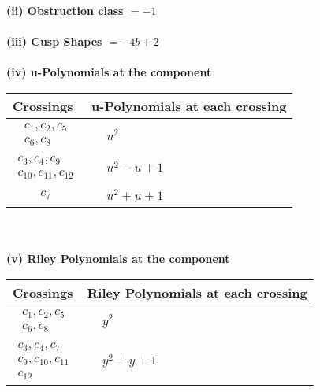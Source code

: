 \documentclass[1p]{elsarticle_modified}
\theoremstyle{definition}
\begin{document}
\flushleft \textbf{(ii) Obstruction class $= -1$}\\~\\
\flushleft \textbf{(iii) Cusp Shapes $= -4 b+2$}\\~\\
\newpage\renewcommand{\arraystretch}{1}
\flushleft \textbf{(iv) u-Polynomials at the component}\newline \\
\begin{tabular}{m{50pt}|m{274pt}}
Crossings & \hspace{64pt}u-Polynomials at each crossing \\
\hline $$\begin{aligned}c_{1},c_{2},c_{5}\\c_{6},c_{8}\end{aligned}$$&$\begin{aligned}
&u^2
\end{aligned}$\\
\hline $$\begin{aligned}c_{3},c_{4},c_{9}\\c_{10},c_{11},c_{12}\end{aligned}$$&$\begin{aligned}
&u^2- u+1
\end{aligned}$\\
\hline $$\begin{aligned}c_{7}\end{aligned}$$&$\begin{aligned}
&u^2+u+1
\end{aligned}$\\
\hline
\end{tabular}\\~\\
\newpage\renewcommand{\arraystretch}{1}
\flushleft \textbf{(v) Riley Polynomials at the component}\newline \\
\begin{tabular}{m{50pt}|m{274pt}}
Crossings & \hspace{64pt}Riley Polynomials at each crossing \\
\hline $$\begin{aligned}c_{1},c_{2},c_{5}\\c_{6},c_{8}\end{aligned}$$&$\begin{aligned}
&y^2
\end{aligned}$\\
\hline $$\begin{aligned}c_{3},c_{4},c_{7}\\c_{9},c_{10},c_{11}\\c_{12}\end{aligned}$$&$\begin{aligned}
&y^2+y+1
\end{aligned}$\\
\hline
\end{tabular}\\~\\
\end{document}
